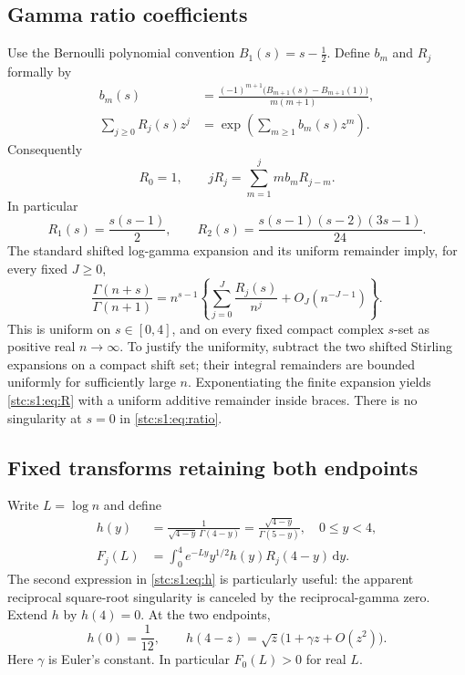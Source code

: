 \documentclass[11pt,letterpaper]{article}
\numberwithin{equation}{section}
\theoremstyle{remark}\newtheorem{remark}[theorem]{Remark}
\newcommand{\dd}{\,\mathrm d}
\newcommand{\Ga}{\Gamma}
\begin{document}
\subsection{Gamma ratio coefficients}
Use the Bernoulli polynomial convention $B_1(s)=s-\tfrac12$. Define $b_m$ and $R_j$ formally by
\begin{align}
 b_m(s)&=\frac{(-1)^{m+1}\bigl(B_{m+1}(s)-B_{m+1}(1)\bigr)}{m(m+1)},\label{stc:s1:eq:b}\\
 \sum_{j\geq0}R_j(s)z^j&=\exp\left(\sum_{m\geq1}b_m(s)z^m\right).\label{stc:s1:eq:R}
\end{align}
Consequently
\begin{equation}\label{stc:s1:eq:Rrec}
 R_0=1,\qquad jR_j=\sum_{m=1}^j m b_m R_{j-m}.
\end{equation}
In particular
\[
 R_1(s)=\frac{s(s-1)}2,\qquad
 R_2(s)=\frac{s(s-1)(s-2)(3s-1)}{24}.
\]
The standard shifted log-gamma expansion and its uniform remainder \cite{dlmfgamma} imply, for every fixed $J\geq0$,
\begin{equation}\label{stc:s1:eq:ratio}
 \frac{\Ga(n+s)}{\Ga(n+1)}
 =n^{s-1}\left\{\sum_{j=0}^J\frac{R_j(s)}{n^j}
                   +O_J(n^{-J-1})\right\}.
\end{equation}
This is uniform on $s\in[0,4]$, and on every fixed compact complex $s$-set as positive real $n\to\infty$. To justify the uniformity, subtract the two shifted Stirling expansions on a compact shift set; their integral remainders are bounded uniformly for sufficiently large $n$. Exponentiating the finite expansion yields \eqref{stc:s1:eq:R} with a uniform additive remainder inside braces. There is no singularity at $s=0$ in \eqref{stc:s1:eq:ratio}.

\subsection{Fixed transforms retaining both endpoints}
Write $L=\log n$ and define
\begin{align}
 h(y)&=\frac1{\sqrt{4-y}\,\Ga(4-y)}
       =\frac{\sqrt{4-y}}{\Ga(5-y)},\quad 0\leq y<4,\label{stc:s1:eq:h}\\
 F_j(L)&=\int_0^4 e^{-Ly}y^{1/2}h(y)R_j(4-y)\dd y.\label{stc:s1:eq:F}
\end{align}
The second expression in \eqref{stc:s1:eq:h} is particularly useful: the apparent reciprocal square-root singularity is canceled by the reciprocal-gamma zero. Extend $h$ by $h(4)=0$. At the two endpoints,
\begin{equation}\label{stc:s1:eq:hends}
 h(0)=\frac1{12},\qquad
 h(4-z)=\sqrt z\bigl(1+\gamma z+O(z^2)\bigr).
\end{equation}
Here $\gamma$ is Euler's constant. In particular $F_0(L)>0$ for real $L$.
\end{document}
